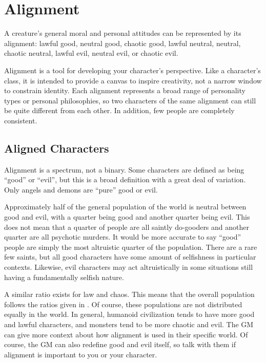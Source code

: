 \section{Alignment}\label{Alignment}
  A creature's general moral and personal attitudes can be represented by its alignment: lawful good, neutral good, chaotic good, lawful neutral, neutral, chaotic neutral, lawful evil, neutral evil, or chaotic evil.

  Alignment is a tool for developing your character's perspective.
  Like a character's class, it is intended to provide a canvas to inspire creativity, not a narrow window to constrain identity.
  Each alignment represents a broad range of personality types or personal philosophies, so two characters of the same alignment can still be quite different from each other.
  In addition, few people are completely consistent.

  \subsection{Aligned Characters}
    Alignment is a spectrum, not a binary.
    Some characters are defined as being ``good'' or ``evil'', but this is a broad definition with a great deal of variation.
    Only angels and demons are ``pure'' good or evil.

    Approximately half of the general population of the world is neutral between good and evil, with a quarter being good and another quarter being evil.
    This does not mean that a quarter of people are all saintly do-gooders and another quarter are all psychotic murders.
    It would be more accurate to say ``good'' people are simply the most altruistic quarter of the population.
    There are a rare few saints, but all good characters have some amount of selfishness in particular contexts.
    Likewise, evil characters may act altruistically in some situations still having a fundamentally selfish nature.

    A similar ratio exists for law and chaos.
    This means that the overall population follows the ratios given in .
    Of course, these populations are not distributed equally in the world.
    In general, humanoid civilization tends to have more good and lawful characters, and monsters tend to be more chaotic and evil.
    The GM can give more context about how alignment is used in their specific world.
    Of course, the GM can also redefine good and evil itself, so talk with them if alignment is important to you or your character.

